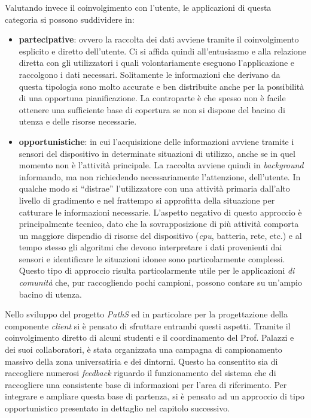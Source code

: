 Valutando invece il coinvolgimento con l'utente, le applicazioni di questa categoria si possono suddividere in:
\begin{itemize}
  \item \textbf{partecipative}: ovvero la raccolta dei dati avviene tramite il coinvolgimento esplicito e diretto dell'utente. Ci si affida quindi all'entusiasmo e alla relazione diretta con gli utilizzatori i quali volontariamente eseguono l'applicazione e raccolgono i dati necessari. Solitamente le informazioni che derivano da questa tipologia sono molto accurate e ben distribuite anche per la possibilità di una opportuna pianificazione. La controparte è che spesso non è facile ottenere una sufficiente base di copertura se non si dispone del bacino di utenza e delle risorse necessarie. 
  \item \textbf{opportunistiche}: in cui l'acquisizione delle informazioni avviene tramite i sensori del dispositivo in determinate situazioni di utilizzo, anche se in quel momento non è l'attività principale. La raccolta avviene quindi in \emph{background} informando, ma non richiedendo necessariamente l'attenzione, dell'utente. In qualche modo si ``distrae'' l'utilizzatore con una attività primaria dall'alto livello di gradimento e nel frattempo si approfitta della situazione per catturare le informazioni necessarie. L'aspetto negativo di questo approccio è principalmente tecnico, dato che la sovrapposizione di più attività comporta un maggiore dispendio di risorse del dispositivo (\emph{cpu}, batteria, rete, etc.) e al tempo stesso gli algoritmi che devono interpretare i dati provenienti dai sensori e identificare le situazioni idonee sono particolarmente complessi. Questo tipo di approccio risulta particolarmente utile per le applicazioni \emph{di comunità} che, pur raccogliendo pochi campioni, possono contare su un'ampio bacino di utenza.
\end{itemize}
Nello sviluppo del progetto \emph{PathS} ed in particolare per la progettazione della componente \emph{client} si è pensato di sfruttare entrambi questi aspetti. Tramite il coinvolgimento diretto di alcuni studenti e il coordinamento del Prof. Palazzi e dei suoi collaboratori, è stata organizzata una campagna di campionamento massivo della zona universatiria e dei dintorni. Questo ha consentito sia di raccogliere numerosi \emph{feedback} riguardo il funzionamento del sistema che di raccogliere una consistente base di informazioni per l'area di riferimento. Per integrare e ampliare questa base di partenza, si è pensato ad un approccio di tipo opportunistico presentato in dettaglio nel capitolo successivo.

